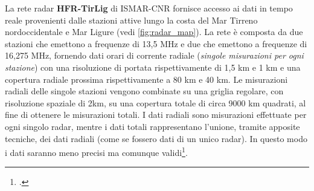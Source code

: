 \documentclass[./main.tex]{subfiles}
\begin{document}
La rete radar \textbf{HFR-TirLig} di ISMAR-CNR fornisce accesso ai dati in tempo reale provenienti dalle stazioni attive lungo la costa del Mar Tirreno nordoccidentale e Mar Ligure (vedi \autoref{fig:radar_map}). La rete è composta da due stazioni che emettono a frequenze di 13,5 MHz e due che emettono a frequenze di 16,275 MHz, fornendo dati orari di corrente radiale (\textit{singole misurazioni per ogni stazione}) con una risoluzione di portata rispettivamente di 1,5 km e 1 km e una copertura radiale prossima rispettivamente a 80 km e 40 km. Le misurazioni radiali delle singole stazioni vengono combinate su una griglia regolare, con risoluzione spaziale di 2km, su una copertura totale di circa 9000 km quadrati, al fine di ottenere le misurazioni totali. I dati radiali sono misurazioni effettuate per ogni singolo radar, mentre i dati totali rappresentano l'unione, tramite apposite tecniche, dei dati radiali (come se fossero dati di un unico radar). In questo modo i dati saranno meno precisi ma comunque validi\footcite[\url{https://www.hfrnode.eu/networks/hfr-tirlig/}]{website-hfr-tirlig}.
\end{document}
